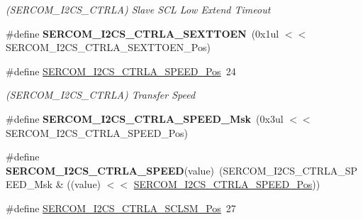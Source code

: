 \begin{DoxyCompactItemize}
\begin{DoxyCompactList}\small\item\em (S\+E\+R\+C\+O\+M\+\_\+\+I2\+C\+S\+\_\+\+C\+T\+R\+L\+A) Slave S\+C\+L Low Extend Timeout \end{DoxyCompactList}\item 
\hypertarget{group___s_a_m_l21___s_e_r_c_o_m_ga86263d9b30983ef7a42cbd2bd7506e83}{}\#define {\bfseries S\+E\+R\+C\+O\+M\+\_\+\+I2\+C\+S\+\_\+\+C\+T\+R\+L\+A\+\_\+\+S\+E\+X\+T\+T\+O\+E\+N}~(0x1ul $<$$<$ S\+E\+R\+C\+O\+M\+\_\+\+I2\+C\+S\+\_\+\+C\+T\+R\+L\+A\+\_\+\+S\+E\+X\+T\+T\+O\+E\+N\+\_\+\+Pos)\label{group___s_a_m_l21___s_e_r_c_o_m_ga86263d9b30983ef7a42cbd2bd7506e83}

\item 
\hypertarget{group___s_a_m_l21___s_e_r_c_o_m_ga03856ff2f8e5c875ba1cb347bc6e4bfe}{}\#define \hyperlink{group___s_a_m_l21___s_e_r_c_o_m_ga03856ff2f8e5c875ba1cb347bc6e4bfe}{S\+E\+R\+C\+O\+M\+\_\+\+I2\+C\+S\+\_\+\+C\+T\+R\+L\+A\+\_\+\+S\+P\+E\+E\+D\+\_\+\+Pos}~24\label{group___s_a_m_l21___s_e_r_c_o_m_ga03856ff2f8e5c875ba1cb347bc6e4bfe}

\begin{DoxyCompactList}\small\item\em (S\+E\+R\+C\+O\+M\+\_\+\+I2\+C\+S\+\_\+\+C\+T\+R\+L\+A) Transfer Speed \end{DoxyCompactList}\item 
\hypertarget{group___s_a_m_l21___s_e_r_c_o_m_ga30a6a7bfa7b97d02181ad7d0898a8ae3}{}\#define {\bfseries S\+E\+R\+C\+O\+M\+\_\+\+I2\+C\+S\+\_\+\+C\+T\+R\+L\+A\+\_\+\+S\+P\+E\+E\+D\+\_\+\+Msk}~(0x3ul $<$$<$ S\+E\+R\+C\+O\+M\+\_\+\+I2\+C\+S\+\_\+\+C\+T\+R\+L\+A\+\_\+\+S\+P\+E\+E\+D\+\_\+\+Pos)\label{group___s_a_m_l21___s_e_r_c_o_m_ga30a6a7bfa7b97d02181ad7d0898a8ae3}

\item 
\hypertarget{group___s_a_m_l21___s_e_r_c_o_m_gae0687f5918d7ba52ca48c44e52ff12fd}{}\#define {\bfseries S\+E\+R\+C\+O\+M\+\_\+\+I2\+C\+S\+\_\+\+C\+T\+R\+L\+A\+\_\+\+S\+P\+E\+E\+D}(value)~(S\+E\+R\+C\+O\+M\+\_\+\+I2\+C\+S\+\_\+\+C\+T\+R\+L\+A\+\_\+\+S\+P\+E\+E\+D\+\_\+\+Msk \& ((value) $<$$<$ \hyperlink{group___s_a_m_l21___s_e_r_c_o_m_ga03856ff2f8e5c875ba1cb347bc6e4bfe}{S\+E\+R\+C\+O\+M\+\_\+\+I2\+C\+S\+\_\+\+C\+T\+R\+L\+A\+\_\+\+S\+P\+E\+E\+D\+\_\+\+Pos}))\label{group___s_a_m_l21___s_e_r_c_o_m_gae0687f5918d7ba52ca48c44e52ff12fd}

\item 
\hypertarget{group___s_a_m_l21___s_e_r_c_o_m_gaa359fcba2a29b5be482f94a01023579e}{}\#define \hyperlink{group___s_a_m_l21___s_e_r_c_o_m_gaa359fcba2a29b5be482f94a01023579e}{S\+E\+R\+C\+O\+M\+\_\+\+I2\+C\+S\+\_\+\+C\+T\+R\+L\+A\+\_\+\+S\+C\+L\+S\+M\+\_\+\+Pos}~27\label{group___s_a_m_l21___s_e_r_c_o_m_gaa359fcba2a29b5be482f94a01023579e}


\end{DoxyCompactItemize}
